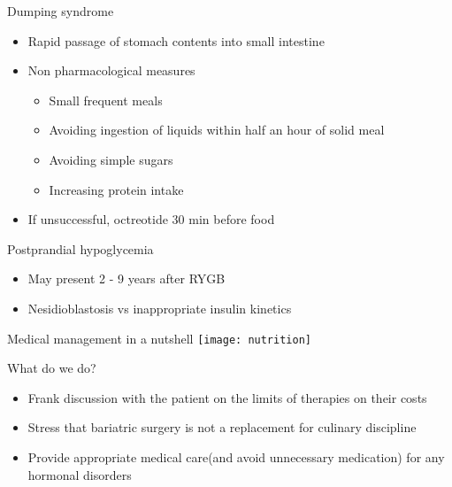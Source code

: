 \documentclass[11pt]{beamer}
\begin{document}
 \begin{frame}{Dumping syndrome  }
 \begin{itemize}
 
 \item Rapid passage of stomach contents into small intestine	
 \item Non pharmacological measures 
 \begin{itemize}
 \item Small frequent meals
\item Avoiding ingestion of liquids within half an hour of solid meal
\item Avoiding simple sugars
\item Increasing protein intake

 \end{itemize}
 \item If unsuccessful, octreotide 30 min before food
 	
 \end{itemize}
 \end{frame} 
 \begin{frame}{Postprandial hypoglycemia  }
 \begin{itemize}
 \item May present 2 - 9 years after RYGB
 \item Nesidioblastosis vs inappropriate insulin kinetics
 \end{itemize}
 \end{frame} 
 
 \begin{frame}[shrink]{Medical management in a nutshell  }
 \texttt{[image: nutrition]}
 \end{frame} 
 \begin{frame}{ What do we do? }
 \begin{itemize}
 
 \item Frank discussion with the patient on the limits of therapies on their costs
 \item Stress that bariatric surgery is not a replacement for culinary discipline
 \item Provide appropriate medical care(and avoid unnecessary medication) for any hormonal disorders
 	
 \end{itemize}
 \end{frame} 
 
\end{document}
